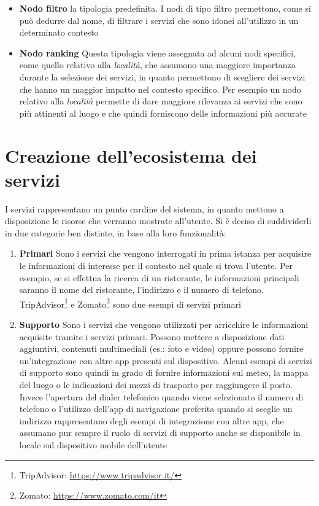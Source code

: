 \begin{itemize}
	\item \textbf{Nodo filtro} \upe la tipologia predefinita. I nodi di tipo filtro permettono, come si può dedurre dal nome, di filtrare i servizi che sono idonei all'utilizzo in un determinato contesto
	\item \textbf{Nodo ranking} Questa tipologia viene assegnata ad alcuni nodi specifici, come quello relativo alla \emph{località}, che assumono una maggiore importanza durante la selezione dei servizi, in quanto permettono di scegliere dei servizi che hanno un maggior impatto nel contesto specifico. Per esempio un nodo relativo alla \emph{località} permette di dare maggiore rilevanza ai servizi che sono più attinenti al luogo e che quindi forniscono delle informazioni più accurate
\end{itemize}

\section{Creazione dell'ecosistema dei servizi\label{sec:ecosistema-servizi}}

I servizi rappresentano un punto cardine del sistema, in quanto mettono a disposizione le risorse che verranno mostrate all'utente. Si è deciso di suddividerli in due categorie ben distinte, in base alla loro funzionalità:

\begin{enumerate}
	\item \textbf{Primari} Sono i servizi che vengono interrogati in prima istanza per acquisire le informazioni di interesse per il contesto nel quale si trova l'utente. Per esempio, se si effettua la ricerca di un ristorante, le informazioni principali saranno il nome del ristorante, l'indirizzo e il numero di telefono. TripAdvisor\footnote{TripAdvisor: \url{https://www.tripadvisor.it/}} e Zomato\footnote{Zomato: \url{https://www.zomato.com/it}} sono due esempi di servizi primari
	\item \textbf{Supporto} Sono i servizi che vengono utilizzati per arricchire le informazioni acquisite tramite i servizi primari. Possono mettere a disposizione dati aggiuntivi, contenuti multimediali (es.: foto e video) oppure possono fornire un'integrazione con altre app presenti sul dispositivo. Alcuni esempi di servizi di supporto sono quindi in grado di fornire informazioni sul meteo, la mappa del luogo o le indicazioni dei mezzi di trasporto per raggiungere il posto. Invece l'apertura del dialer telefonico quando viene selezionato il numero di telefono o l'utilizzo dell'app di navigazione preferita quando si sceglie un indirizzo rappresentano degli esempi di integrazione con altre app, che assumano pur sempre il ruolo di servizi di supporto anche se disponibile in locale sul dispositivo mobile dell'utente
\end{enumerate}

